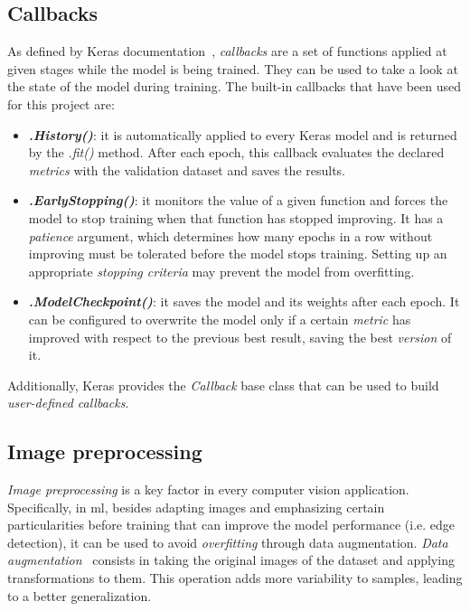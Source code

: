\subsection{Callbacks} \label{subsec:callbacks}
As defined by Keras documentation~\cite{chollet2015keras}, \emph{callbacks} are a set of functions applied at given stages while the model is being trained. They can be used to take a look at the state of the model during training. The built-in callbacks that have been used for this project are:
\begin{itemize}
	\item \textbf{\textit{.History()}}: it is automatically applied to every Keras model and is returned by the \textit{.fit()} method. After each epoch, this callback evaluates the declared \textit{metrics} with the validation dataset and saves the results.
	
	\item \textbf{\textit{.EarlyStopping()}}: it monitors the value of a given function and forces the model to stop training when that function has stopped improving. It has a \emph{\textit{patience}} argument, which determines how many epochs in a row without improving must be tolerated before the model stops training. Setting up an appropriate \emph{stopping criteria} may prevent the model from overfitting.
	
	\item \textbf{\textit{.ModelCheckpoint()}}: it saves the model and its weights after each epoch. It can be configured to overwrite the model only if a certain \textit{metric} has improved with respect to the previous best result, saving the best \textit{version} of it.
\end{itemize}

Additionally, Keras provides the \textit{Callback} base class that can be used to build \emph{user-defined callbacks}.

\subsection{Image preprocessing}\label{subsec:utils}
\emph{Image preprocessing} is a key factor in every computer vision application. Specifically, in \gls{ml}, besides adapting images and emphasizing certain particularities before training that can improve the model performance (i.e. edge detection), it can be used to avoid \emph{overfitting} through data augmentation. \emph{Data augmentation}~\cite{DBLP:journals/corr/WongGSM16} consists in taking the original images of the dataset and applying transformations to them. This operation adds more variability to samples, leading to a better generalization.

